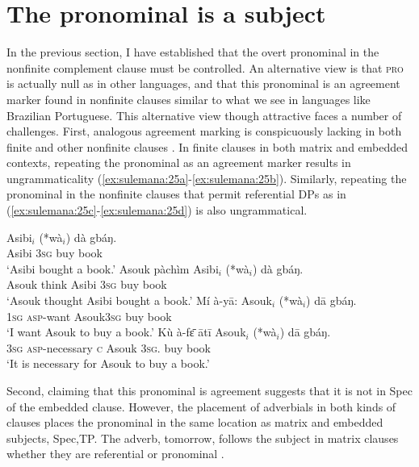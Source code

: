 \documentclass[output=paper,colorlinks,citecolor=brown]{langscibook}
\begin{document}
\section{The pronominal is a subject}\label{sec:sulemana:5}

In the previous section, I have established that the overt pronominal in the nonfinite complement clause must be controlled. An alternative view is that \textsc{pro} is actually null as in other languages, and that this pronominal is an agreement marker found in nonfinite clauses similar to what we see in languages like Brazilian Portuguese. This alternative view though attractive faces a number of challenges.
First, analogous agreement marking is conspicuously lacking in both finite and other nonfinite clauses . In finite clauses in both matrix and embedded contexts, repeating the pronominal as an agreement marker results in ungrammaticality (\ref{ex:sulemana:25a}-\ref{ex:sulemana:25b}). 
Similarly, repeating the pronominal in the nonfinite clauses that permit referential DPs as in (\ref{ex:sulemana:25c}-\ref{ex:sulemana:25d}) is also ungrammatical. 

\ea%
    \label{ex:sulemana:25}
    \ea%
    \label{ex:sulemana:25a}
    \gll    Asibi$_i$  (*wà$_i$) dà gbáŋ. \\
            Asibi  \textsc{3sg} buy book\\
    \glt    `Asibi bought a book.'
    \ex%
    \label{ex:sulemana:25b}
    \gll    Asouk pàchìm Asibi$_i$ (*wà$_i$) dà gbáŋ. \\
            Asouk think Asibi   \textsc{3sg} buy book\\
    \glt    `Asouk thought Asibi bought a book.'
    \ex%
    \label{ex:sulemana:25c}
    \gll    Mí à-yā: Asouk$_i$ (*wà$_i$) dā gbáŋ. \\
            \textsc{1sg} \textsc{asp}-want Asouk\textsc{3sg} buy book\\
    \glt    `I want Asouk to buy a book.'
    \ex%
    \label{ex:sulemana:25d}
    \gll    Kù à-fɛ̄ ātī Asouk$_i$ (*wà$_i$) dā gbáŋ. \\
            \textsc{3sg} \textsc{asp}-necessary \textsc{c} Asouk \textsc{3sg}. buy book\\
    \glt    `It is necessary for Asouk to buy a book.' 
    \z
\z

Second, claiming that this pronominal is agreement suggests that it is not in Spec of the embedded clause. However, the placement of adverbials in both kinds of clauses places the pronominal in the same location as matrix and embedded subjects, Spec,TP. The adverb, tomorrow, follows the subject in matrix clauses whether they are referential  or pronominal . 
\end{document}
